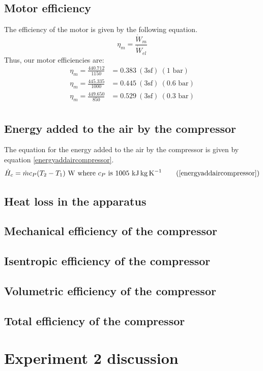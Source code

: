 \documentclass[class=article, crop=false, 12pt,a4paper]{standalone}
\numberwithin{equation}{section}
\begin{document}
\subsection{Motor efficiency}
The efficiency of the motor is given by the following equation.
\begin{equation}
  \eta_m = \frac{\dot{W}_m}{\dot{W}_{el}}
\end{equation}
Thus, our motor efficiencies are:
\begin{align}
  \eta_m = \frac{440.712}{1150} &= 0.383 \ (3\textrm{sf}) \ (1 \textrm{ bar})\\
  \eta_m = \frac{445.335}{1000} &= 0.445 \ (3\textrm{sf}) \ (0.6 \textrm{ bar})\\
  \eta_m = \frac{449.650}{850} &= 0.529 \ (3\textrm{sf}) \ (0.3 \textrm{ bar})\\
\end{align}
\subsection{Energy added to the air by the compressor}
The equation for the energy added to the air by the compressor is given by equation \ref{energyaddaircompressor}.
\begin{equation}
  \dot{H}_c = \dot{m}c_P(T_2-T_1) \ \si{\watt} \textrm{ where \(c_P\) is 1005 \si{\kilo\joule\kg\per\kelvin}}
  \tag{\ref{energyaddaircompressor}}
\end{equation}
\subsection{Heat loss in the apparatus}
\subsection{Mechanical efficiency of the compressor}
\subsection{Isentropic efficiency of the compressor}
\subsection{Volumetric efficiency of the compressor}
\subsection{Total efficiency of the compressor}
\section{Experiment 2 discussion}
\end{document}
